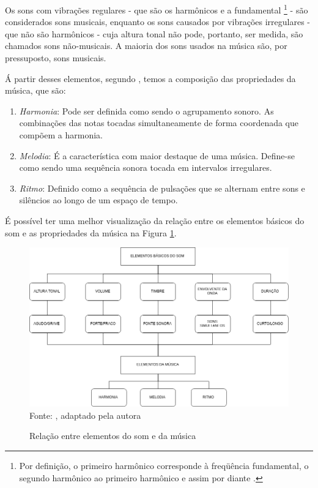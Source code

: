 Os sons com vibrações regulares - que são os harmônicos e a fundamental \footnote{Por definição, o primeiro harmônico corresponde à freqüência fundamental, o segundo harmônico ao primeiro harmônico e assim por diante \cite{muller2007}.} - são considerados sons musicais, enquanto os sons causados por vibrações irregulares - que não são harmônicos - cuja altura tonal não pode, portanto, ser medida, são chamados sons não-musicais. A maioria dos sons usados na música são, por pressuposto, sons musicais.

Á partir desses elementos, segundo , temos a composição das propriedades da música, que são:

\begin{enumerate}
    \item \textit{Harmonia}: Pode ser definida como sendo o agrupamento sonoro. As combinações das notas tocadas simultaneamente de forma coordenada que compõem a harmonia.
    
    \item \textit{Melodia}: É a característica com maior destaque de uma música. Define-se como sendo uma sequência sonora tocada em intervalos irregulares.
    
    \item \textit{Ritmo}: Definido como a sequência de pulsações que se alternam entre sons e silêncios ao longo de um espaço de tempo.
\end{enumerate}

É possível ter uma melhor visualização da relação entre os elementos básicos do som e as propriedades da música na Figura \ref{fig:elementosMusica}.

\begin{figure}[!htb]
   \centering
   \caption{Relação entre elementos do som e da música}\label{fig:elementosMusica} 
   \includegraphics[scale=0.50]{figuras/elementosMusica.png}
   \\Fonte: \cite{ferreira2015}, adaptado pela autora
\end{figure}

